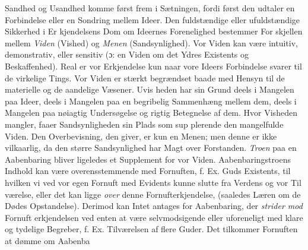 \documentclass[12pt,a4paper]{book}
\begin{document}
Sandhed og Usandhed komme først frem i Sætningen,
fordi først den udtaler en Forbindelse eller en Sondring mellem
Ideer. Den fuldstændige eller ufuldstændige Sikkerhed i Er\-%
kjendelsens Dom om Ideernes Forenelighed bestemmer For\-%
skjellen mellem \emph{Viden} (Vished) og \emph{Menen} (Sandsynlighed).
Vor Viden kan være intuitiv, demonstrativ, eller sensitiv
(ɔ: en Viden om det Ydres Existents og Beskaffenhed). Real
er vor Erkjendelse kun naar vore Ideers Forbindelse svarer
til de virkelige Tings. Vor Viden er stærkt begrændset baade
med Hensyn til de materielle og de aandelige Væsener. Uvis\-%
heden har sin Grund deels i Mangelen paa Ideer, deels i Mangelen
paa en begribelig Sammenhæng mellem dem, deels i Mangelen
paa nøiagtig Undersøgelse og rigtig Betegnelse af dem. Hvor
Visheden mangler, faaer Sandsynligheden sin Plads som sup\-%
plerende den mangelfulde Viden. Den Overbevisning, den
giver, er kun en Menen; men denne er ikke vilkaarlig, da den
større Sandsynlighed har Magt over Forstanden. \emph{Troen} paa
en Aabenbaring bliver ligeledes et Supplement for vor Viden.
Aabenbaringstroens Indhold kan være overensstemmende med
Fornuften, f. Ex. Guds Existents, til hvilken vi ved vor egen
Fornuft med Evidents kunne slutte fra Verdens og vor Til\-%
værelse, eller det kan ligge \emph{over} denne Fornufterkjendelse,
(saaledes Læren om de Dødes Opstandelse). Derimod kan
Intet antages for Aabenbaring, der \emph{strider mod} Fornuft\-%
erkjendelsen ved enten at være selvmodsigende eller uforeneligt
med klare og tydelige Begreber, f. Ex. Tilværelsen af flere
Guder. Det tilkommer Fornuften at dømme om Aabenba\-%
\end{document}
